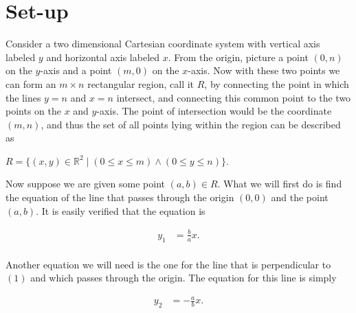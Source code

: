 \documentclass[12pt, a4paper]{article}
\begin{document}
\section{Set-up}
\hline

\vspace{4mm}

Consider a two dimensional Cartesian coordinate system with vertical axis labeled $y$ and horizontal axis labeled $x$. From the origin, picture a point $(0,n)$ on the $y$-axis and a point $(m, 0)$ on the $x$-axis. Now with these two points we can form an $m\times n$ rectangular region, call it $R$, by connecting the point in which the lines $y=n$ and $x=n$ intersect, and connecting this common point to the two points on the $x$ and $y$-axis. The point of intersection would be the coordinate $(m,n)$, and thus the set of all points lying within the region can be described as

\vspace{4mm}

\centerline{$R=\{(x,y)\in\mathbb{R}^2\mid (0\leq x\leq m)\wedge(0\leq y\leq n)\}$.}

\vspace{4mm}\par

Now suppose we are given some point $(a,b)\in R$. What we will first do is find the equation of the line that passes through the origin $(0,0)$ and the point $(a,b)$. It is easily verified that the equation is 

    \begin{equation}
        \begin{split}
            y_1 &= \frac{b}{a}x. \\
        \end{split}
    \end{equation}
    
\vspace{4mm}

\noindent Another equation we will need is the one for the line that is perpendicular to $(1)$ and which passes through the origin. The equation for this line is simply 

    \begin{equation}
        \begin{split}
            y_2 &= -\frac{a}{b}x. \\
        \end{split}
    \end{equation}
    
\vspace{4mm}
\end{document}
